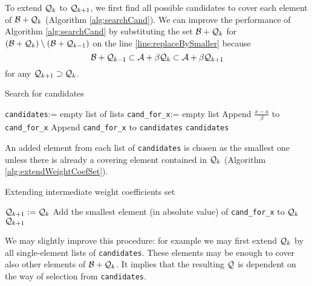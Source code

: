 To extend $\mathcal{Q}_{k}$ to $\mathcal{Q}_{k+1}$, we first find all possible candidates to cover each element of  $\mathcal{B} + \mathcal{Q}_{k}$ (Algorithm \ref{alg:searchCand}). We can improve the performance of Algorithm \ref{alg:searchCand} by substituting the set $\mathcal{B} + \mathcal{Q}_{k}$ for $(\mathcal{B} + \mathcal{Q}_{k})\setminus (\mathcal{B} + \mathcal{Q}_{k-1})$ on the line \ref{line:replaceBySmaller} because
$$
\mathcal{B} + \mathcal{Q}_{k-1} \subset \mathcal{A} + \beta \mathcal{Q}_{k} \subset \mathcal{A} + \beta \mathcal{Q}_{k+1}
$$
for any $\mathcal{Q}_{k+1} \supset \mathcal{Q}_{k}$.

\begin{algorithm}
  \caption{Search for candidates}
    \label{alg:searchCand}
  \begin{algorithmic}[1]
    \STATE \verb+candidates+:= empty list of lists
     \label{line:replaceBySmaller}
      \STATE \verb+cand_for_x+:= empty list
              \STATE Append $\frac{x-a}{\beta}$ to \verb+cand_for_x+
            \ENDIF
      \ENDFOR 
      \STATE Append \verb+cand_for_x+ to \verb+candidates+
  \ENDFOR
  \RETURN \verb+candidates+
  \end{algorithmic}
\end{algorithm}  


An added element from each list of \verb+candidates+ is chosen as the smallest one unless there is already a covering element contained in $\mathcal{Q}_{k}$ (Algorithm \ref{alg:extendWeightCoefSet}).  

\begin{algorithm}
  \caption{Extending intermediate weight coefficients set}
    \label{alg:extendWeightCoefSet}
  \begin{algorithmic}[1]
    \STATE $\mathcal{Q}_{k+1}:=\mathcal{Q}_{k}$
            \STATE Add the smallest element (in absolute value) of  \verb+cand_for_x+ to $\mathcal{Q}_{k}$  
        \ENDIF
    \ENDFOR
    \RETURN $\mathcal{Q}_{k+1}$
  \end{algorithmic}
\end{algorithm}
    
We may slightly improve this procedure: for example we may first extend $\mathcal{Q}_{k}$ by all single-element lists of \verb+candidates+. These elements may be enough to cover also other elements of $\mathcal{B}+\mathcal{Q}_{k}$. It implies that the resulting $\mathcal{Q}$ is dependent on the way of selection from \verb+candidates+.
  
